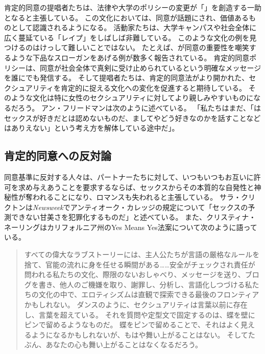 \documentclass[paper=a4,book,openany]{jlreq}
\newcommand{\ig}[1]{}           %
\begin{document}
肯定的同意の提唱者たちは、法律や大学のポリシーの変更が「」を創造する一助となると主張している。
この文化においては、同意が話題にされ、価値あるものとして認識されるようになる。
活動家たちは、大学キャンパスや社会全体に広く蔓延ている「レイプ」をしばしば非難している。
このような文化の例を見つけるのはけっして難しいことではない。
たとえば、が同意の重要性を嘲笑するような下品なスローガンをあげる例が数多く報告されている\citep{jackson18:_frat_barred_yale_years_is_back}。
肯定的同意ポリシーは、同意が社会全体で真剣に受け止められているという明確なメッセージを誰にでも発信する。
そして提唱者たちは、肯定的同意法がより開かれた、セクシュアリティを肯定的に捉える文化への変化を促進すると期待している。
そのような文化は特に女性のセクシュアリティに対してより親しみやすいものになるだろう。
アン・フリードマン\ig{Ann Friedman}は次のように述べている。
「私たちはまだ、「はセックスが好きだとは認めないものだ、ましてやどう好きなのかを話すことなどはありえない」という考え方を解体している途中だ」\citep{friedman14:_oh_yes_means_yes}。

\subsection{肯定的同意への反対論}

同意基準に反対する人々は、パートナーたちに対して、いつもいつもお互いに許可を求め与えあうことを要求するならば、セックスからその本質的な自発性と神秘性が奪われることになり、ロマンスも失われると主張している。
サラ・クリクトンは\emph{Newsweek}でアンティオーク・カレッジの規定について「セックスの予測できない甘美さを犯罪化するものだ」と述べている\citep{crichton93:_sexual_correc}。
また、クリスティナ・ネーリングはカリフォルニア州のYes Means Yes法案について次のように語っている。

\begin{quote}

すべての偉大なラブストーリーには、主人公たちが言語の厳格なルールを捨て、官能の流れに身を任せる瞬間がある……安全がチェックされ責任が問われる私たちの文化、際限のないおしゃべり、メッセージを送り、ブログを書き、他人のご機嫌を取り、謝罪し、分析し、言語化しつづける私たちの文化の中で、エロティシズムは直観で探索できる最後のフロンティアかもしれない。
ダンスのように、セクシュアリティは言葉以前に存在し、言葉を超えている。
それを質問や定型文で固定するのは、蝶を壁にピンで留めるようなものだ。
蝶をピンで留めることで、それはよく見えるようになるかもしれないが、もはや舞い上がることはない。
そしてたぶん、あなたの心も舞い上がることはなくなるだろう。
\citep{nehring15:_are_today_legal_defin_rape}
\end{quote}
\end{document}
